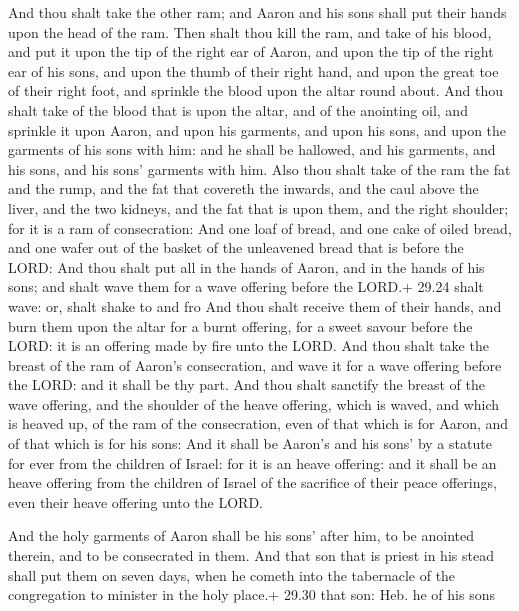  And thou shalt take the other ram; and Aaron and his
sons shall put their hands upon the head of the ram.  Then
shalt thou kill the ram, and take of his blood, and put it upon the tip
of the right ear of Aaron, and upon the tip of the right ear of his
sons, and upon the thumb of their right hand, and upon the great toe of
their right foot, and sprinkle the blood upon the altar round about.
 And thou shalt take of the blood that is upon the altar,
and of the anointing oil, and sprinkle it upon Aaron, and upon his
garments, and upon his sons, and upon the garments of his sons with him:
and he shall be hallowed, and his garments, and his sons, and his sons'
garments with him.  Also thou shalt take of the ram the fat
and the rump, and the fat that covereth the inwards, and the caul above
the liver, and the two kidneys, and the fat that is upon them, and the
right shoulder; for it is a ram of consecration:  And one
loaf of bread, and one cake of oiled bread, and one wafer out of the
basket of the unleavened bread that is before the LORD: 
And thou shalt put all in the hands of Aaron, and in the hands of his
sons; and shalt wave them for a wave offering before the LORD.+ 29.24
shalt wave: or, shalt shake to and fro  And thou shalt
receive them of their hands, and burn them upon the altar for a burnt
offering, for a sweet savour before the LORD: it is an offering made by
fire unto the LORD.  And thou shalt take the breast of the
ram of Aaron's consecration, and wave it for a wave offering before the
LORD: and it shall be thy part.  And thou shalt sanctify
the breast of the wave offering, and the shoulder of the heave offering,
which is waved, and which is heaved up, of the ram of the consecration,
even of that which is for Aaron, and of that which is for his sons:
 And it shall be Aaron's and his sons' by a statute for
ever from the children of Israel: for it is an heave offering: and it
shall be an heave offering from the children of Israel of the sacrifice
of their peace offerings, even their heave offering unto the LORD.

 And the holy garments of Aaron shall be his sons' after
him, to be anointed therein, and to be consecrated in them.
 And that son that is priest in his stead shall put them on
seven days, when he cometh into the tabernacle of the congregation to
minister in the holy place.+ 29.30 that son: Heb. he of his sons

